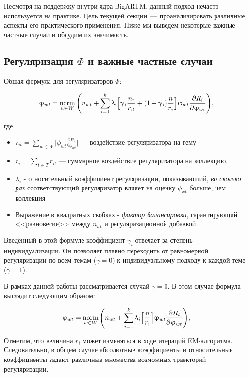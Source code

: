 Несмотря на поддержку внутри ядра BigARTM, данный подход нечасто используется на практике. Цель текущей секции~--- проанализировать различные аспекты его практического применения. Ниже мы выведем некоторые важные частные случаи и обсудим их значимость.

\subsection{Регуляризация $\Phi$ и важные частные случаи}

Общая формула для регуляризаторов $\Phi$:

\[
\upvarphi_{wt} = \mathop{\mathrm{norm}}\limits_{w \in W}\Bigg(
    n_{wt} + \sum_{i=1}^k \uplambda_i \Big[
        \upgamma_i \frac{n_t}{r_{it}} + (1-\upgamma_i)\frac{n}{r_i}
        \Big]
    \upvarphi_{wt} \frac{\partial R_i}{\partial \upvarphi_{wt}}
\Bigg), \label{rel_phi_general}
\]

где:

\begin{itemize}
    \item{$r_{it} = \sum_{w\in W} \Big| \phi_{wt} \frac{\partial R_i}{\partial \phi_{wt}} \Big| $ --- воздействие регуляризатора на тему}
    \item { $r_{i} = \sum_{t\in T} r_{it}$ --- суммарное воздействие регуляризатора на коллекцию.}
    \item { $\lambda_i$ - относительный коэффициент регуляризации, показывающий, \emph{во сколько раз} соответствующий регуляризатор влияет на оценку $\phi_{wt}$ больше, чем коллекция}
    \item {Выражение в квадратных скобках - \textit{фактор балансировки}, гарантирующий <<равновесие>> между $n_{wt}$ и регуляризационной добавкой}
\end{itemize}

Введённый в этой формуле коэффициент $\gamma_i$ отвечает за степень индивидуализации. Он позволяет плавно переходить от равномерной регуляризации по всем темам ($\gamma = 0$) к индивидуальному подходу к каждой теме ($\gamma = 1$). 

В рамках данной работы рассматривается случай $\gamma = 0$. В этом случае формула выглядит следующим образом:

\[
\upvarphi_{wt} = \mathop{\mathrm{norm}}\limits_{w \in W}\Bigg(
    n_{wt} + \sum_{i=1}^k \uplambda_i \Big[
        \frac{n}{r_i}
        \Big]
    \upvarphi_{wt} \frac{\partial R_i}{\partial \upvarphi_{wt}}
\Bigg), \label{rel_phi_general}
\]

Отметим, что величина $r_{i}$ может изменяться в ходе итераций EM-алгоритма. Следовательно, в общем случае абсолютные коэффициенты и относительные  коэффициенты задают различные множества возможных траекторий регуляризации.

